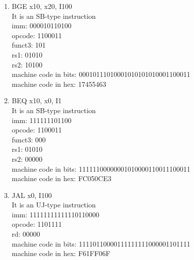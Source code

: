 \documentclass[12pt,letterpaper]{article}
\begin{document}
\begin{enumerate}
\item
BGE x10, x20, I100
\\It is an SB-type instruction
\\imm: 000010110100
\\opcode: 1100011
\\funct3: 101
\\rs1: 01010
\\rs2: 10100
\\machine code in bits: 00010111010001010101010001100011		          
\\machine code in hex: 17455463

\item
BEQ x10, x0, I1
\\It is an SB-type instruction
\\imm: 111111101100
\\opcode: 1100011
\\funct3: 000
\\rs1: 01010
\\rs2: 00000
\\machine code in bits: 11111100000001010000110011100011
\\machine code in hex: FC050CE3

\item
JAL x0, I100
\\It is an UJ-type instruction
\\imm: 11111111111110110000
\\opcode: 1101111
\\rd: 00000
\\machine code in bits: 11110110000111111111000001101111
\\machine code in hex: F61FF06F

\end{enumerate}
\newpage
\end{document}
